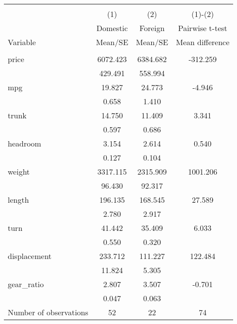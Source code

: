 
\begin{tabular}{@{\extracolsep{5pt}}lccc}
\\[-1.8ex]\hline \hline \\[-1.8ex]
 & \multicolumn{1}{c}{(1)}  & \multicolumn{1}{c}{(2)}  & \multicolumn{1}{c}{(1)-(2)} \\
 & \multicolumn{1}{c}{Domestic}  & \multicolumn{1}{c}{Foreign}  & \multicolumn{1}{c}{Pairwise t-test}  \\
Variable & Mean/SE & Mean/SE & Mean difference \\ \hline \\[-1.8ex] 
price   &  6072.423    &  6384.682    &  -312.259   \\
 &   429.491  &   558.994  &   \\
mpg   &    19.827    &    24.773    &    -4.946   \\
 &     0.658  &     1.410  &   \\
trunk   &    14.750    &    11.409    &     3.341   \\
 &     0.597  &     0.686  &   \\
headroom   &     3.154    &     2.614    &     0.540   \\
 &     0.127  &     0.104  &   \\
weight   &  3317.115    &  2315.909    &  1001.206   \\
 &    96.430  &    92.317  &   \\
length   &   196.135    &   168.545    &    27.589   \\
 &     2.780  &     2.917  &   \\
turn   &    41.442    &    35.409    &     6.033   \\
 &     0.550  &     0.320  &   \\
displacement   &   233.712    &   111.227    &   122.484   \\
 &    11.824  &     5.305  &   \\
gear\_ratio   &     2.807    &     3.507    &    -0.701   \\
 &     0.047  &     0.063  &   \\
Number of observations  & 52   & 22  & 74   \\

\end{tabular}

